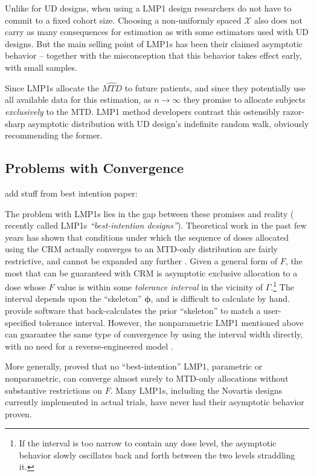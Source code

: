 Unlike for UD designs, when using a LMP1 design researchers do not have to commit to a fixed cohort size. Choosing a non-uniformly spaced $\mathcal{X}$ also does not carry as many consequences for estimation as with some estimators used with UD designs. But the main selling point of LMP1s has been their claimed asymptotic behavior -- together with the misconception that this behavior takes effect early, with small samples.

Since LMP1s allocate the $\widehat{MTD}$ to future patients, and since they potentially use all available data for this estimation, as $n\to\infty$ they promise to allocate subjects \emph{exclusively} to the MTD. LMP1 method developers contrast this ostensibly razor-sharp asymptotic distribution with UD design's indefinite random walk, obviously recommending the former.

\subsection{Problems with Convergence}
add stuff from best intention paper:

The problem with LMP1s lies in the gap between these promises and reality (\cite{Fedo:Flou:Wu:Zhang:Best:2011} recently called LMP1s \emph{``best-intention designs''}). Theoretical work in the past few years has shown that conditions under which the sequence of doses allocated using the CRM actually converges to an MTD-only distribution are fairly restrictive, and cannot be expanded any further \citep{Azri:anot:2012,Lee:Cheu:interv:calibr:2009,oron:azri:hoff:dose:2011}. Given a general form of $F$, the most that can be guaranteed with CRM is asymptotic exclusive allocation to a dose whose $F$ value is within some \emph{tolerance interval} in the vicinity of $\Gamma$.\footnote{If the interval is too narrow to contain any dose level, the asymptotic behavior slowly oscillates back and forth between the two levels straddling it.} The interval depends upon the ``skeleton'' $\boldsymbol{\phi}$, and is difficult to calculate by hand. \cite{Lee:Cheu:interv:calibr:2009} provide software that back-calculates the prior ``skeleton'' to match a user-specified tolerance interval. However, the nonparametric LMP1 mentioned above can guarantee the same type of convergence by using the interval width directly, with no need for a reverse-engineered model \citep{Ivan:Flou:Chun:Cumu:2007,oron:azri:hoff:dose:2011}.

More generally, \cite{Azri:etal:imposs:2011} proved that no ``best-intention'' LMP1, parametric or nonparametric, can converge almost surely to MTD-only allocations without substantive restrictions on $F$. Many LMP1s, including the Novartis designs currently implemented in actual trials, have never had their asymptotic behavior proven.

